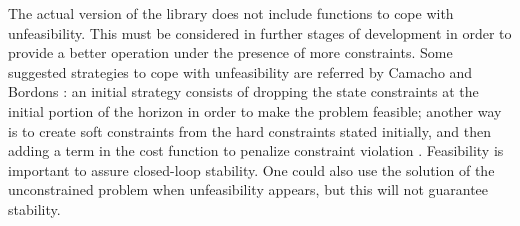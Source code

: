 The actual version of the library does not include functions to cope with unfeasibility. This must be considered in further stages of development in order to provide a better operation under the presence of more constraints. Some suggested strategies to cope with unfeasibility are referred by Camacho and Bordons \cite{CamachoBordons}: an initial strategy consists of dropping the state constraints at the initial portion of the horizon in order to make the problem feasible; another way is to create soft constraints from the hard constraints stated initially, and then adding a term in the cost function to penalize constraint violation \cite{Molero2011}. Feasibility is important to assure closed-loop stability. One could also use the solution of the unconstrained problem  when unfeasibility appears, but this will not guarantee stability.\\

  



